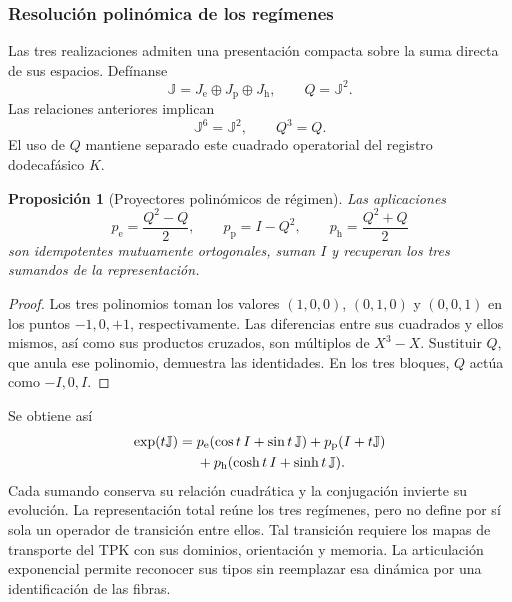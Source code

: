 \documentclass[a4paper,10pt]{article}
\newtheorem{proposition}[theorem]{Proposición}
\theoremstyle{definition}\newtheorem{definition}[theorem]{Definición}
\theoremstyle{remark}\newtheorem{remark}[theorem]{Observación}
\numberwithin{equation}{section}
\begin{document}
\subsubsection{Resolución polinómica de los regímenes}

Las tres realizaciones admiten una presentación compacta sobre la suma
directa de sus espacios. Defínanse
\[
 \mathbb J=J_{\mathrm e}\oplus J_{\mathrm p}\oplus J_{\mathrm h},
 \qquad Q=\mathbb J^2.
\]
Las relaciones anteriores implican
\[
 \mathbb J^6=\mathbb J^2,\qquad Q^3=Q.
\]
El uso de \(Q\) mantiene separado este cuadrado operatorial del registro
dodecafásico \(K\).

\begin{proposition}[Proyectores polinómicos de régimen]
\label{euler-trit-proyectores}
Las aplicaciones
\[
 p_{\mathrm e}=\frac{Q^2-Q}{2},\qquad
 p_{\mathrm p}=I-Q^2,\qquad
 p_{\mathrm h}=\frac{Q^2+Q}{2}
\]
son idempotentes mutuamente ortogonales, suman \(I\) y recuperan los tres
sumandos de la representación.
\end{proposition}
\begin{proof}
Los tres polinomios toman los valores \((1,0,0)\), \((0,1,0)\) y
\((0,0,1)\) en los puntos \(-1,0,+1\), respectivamente. Las diferencias
entre sus cuadrados y ellos mismos, así como sus productos cruzados, son
múltiplos de \(X^3-X\). Sustituir \(Q\), que anula ese polinomio, demuestra
las identidades. En los tres bloques, \(Q\) actúa como \(-I,0,I\).
\end{proof}

Se obtiene así
\begin{align}
 \exp(t\mathbb J)
 ={}&p_{\mathrm e}(\cos t\,I+\sin t\,\mathbb J)
   +p_{\mathrm p}(I+t\mathbb J)\notag\\
   &+p_{\mathrm h}(\cosh t\,I+\sinh t\,\mathbb J).
 \label{euler-trit-exponencial-total}
\end{align}
Cada sumando conserva su relación cuadrática y la conjugación invierte
su evolución. La representación total reúne los tres regímenes, pero no
define por sí sola un operador de transición entre ellos. Tal transición
requiere los mapas de transporte del TPK con sus dominios, orientación y
memoria. La articulación exponencial permite reconocer sus tipos sin
reemplazar esa dinámica por una identificación de las fibras.
\end{document}
